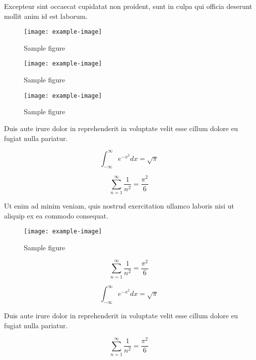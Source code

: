\documentclass{article}
\begin{document}
Excepteur sint occaecat cupidatat non proident, sunt in culpa qui officia deserunt mollit anim id est laborum.

\begin{figure}[h]
    \centering
    \texttt{[image: example-image]}
    \caption{Sample figure}
    \label{fig:sample}
\end{figure}


\begin{figure}[h]
    \centering
    \texttt{[image: example-image]}
    \caption{Sample figure}
    \label{fig:sample}
\end{figure}

\begin{figure}[h]
    \centering
    \texttt{[image: example-image]}
    \caption{Sample figure}
    \label{fig:sample}
\end{figure}

Duis aute irure dolor in reprehenderit in voluptate velit esse cillum dolore eu fugiat nulla pariatur.

\begin{equation}
    \int_{-\infty}^{\infty} e^{-x^2} dx = \sqrt{\pi}
\end{equation}

\begin{equation}
    \sum_{n=1}^{\infty} \frac{1}{n^2} = \frac{\pi^2}{6}
\end{equation}

Ut enim ad minim veniam, quis nostrud exercitation ullamco laboris nisi ut aliquip ex ea commodo consequat.

\begin{figure}[h]
    \centering
    \texttt{[image: example-image]}
    \caption{Sample figure}
    \label{fig:sample}
\end{figure}

\begin{equation}
    \sum_{n=1}^{\infty} \frac{1}{n^2} = \frac{\pi^2}{6}
\end{equation}

\begin{equation}
    \int_{-\infty}^{\infty} e^{-x^2} dx = \sqrt{\pi}
\end{equation}

Duis aute irure dolor in reprehenderit in voluptate velit esse cillum dolore eu fugiat nulla pariatur.


\begin{equation}
    \sum_{n=1}^{\infty} \frac{1}{n^2} = \frac{\pi^2}{6}
\end{equation}
\end{document}
